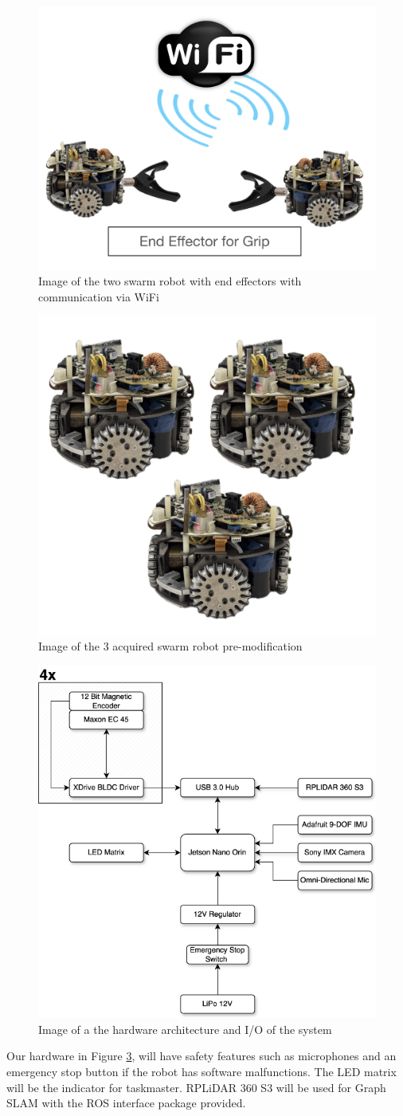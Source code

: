 \begin{figure}
    \centering
    \includegraphics[width=0.5\linewidth]{assets/images/hardware/endeffector.png}
    \caption{Image of the two swarm robot with end effectors with communication via WiFi}
    \label{fig:effector-2-robot}
\end{figure}
\begin{figure}
    \centering
    \includegraphics[width=0.5\linewidth]{assets/images/hardware/3swarmrobots.png}
    \caption{Image of the 3 acquired swarm robot pre-modification}
    \label{fig:3-robot}
\end{figure}\begin{figure}
    \centering
    \includegraphics[width=0.75\linewidth]{assets/images/hardware/hardware-architecture.png}
    \caption{Image of a the hardware architecture and I/O of the system}
    \label{fig:hardware-arch}
\end{figure}

Our hardware in Figure \ref{fig:hardware-arch}, will have safety features such as microphones and an emergency stop button if the robot has software malfunctions. The LED matrix will be the indicator for taskmaster. RPLiDAR 360 S3 will be used for Graph SLAM with the ROS interface package provided. 
